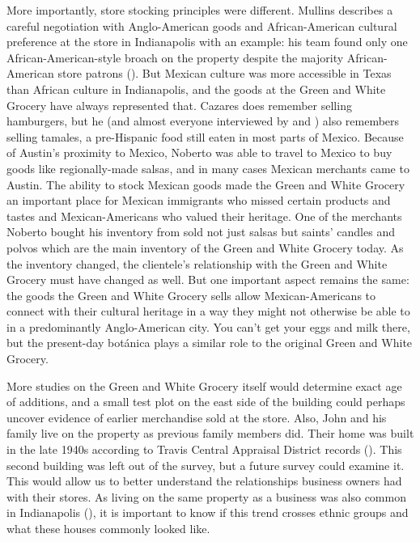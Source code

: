 More importantly, store stocking principles were different. Mullins describes a careful negotiation with Anglo-American goods and African-American cultural preference at the store in Indianapolis with an example: his team found only one African-American-style broach on the property despite the majority African-American store patrons (\cite[92]{mullins}). But Mexican culture was more accessible in Texas than African culture in Indianapolis, and the goods at the Green and White Grocery have always represented that. Cazares does remember selling hamburgers, but he
(and almost everyone interviewed by \textcite[75-76]{lepe} and \textcite{gandara})
also remembers selling tamales, a pre-Hispanic food still eaten in most parts of Mexico. Because of Austin's proximity to Mexico, Noberto was able to travel to Mexico to buy goods like regionally-made salsas, and in many cases Mexican merchants came to Austin. The ability to stock Mexican goods made the Green and White Grocery an important place for Mexican immigrants who missed certain products and tastes and Mexican-Americans who valued their heritage. One of the merchants Noberto bought his inventory from sold not just salsas but saints’ candles and polvos which are the main inventory of the Green and White Grocery today. As the inventory changed, the clientele's relationship with the Green and White Grocery must have changed as well. But one important aspect remains the same: the goods the Green and White Grocery sells allow Mexican-Americans to connect with their cultural heritage in a way they might not otherwise be able to in a predominantly Anglo-American city. You can't get your eggs and milk there, but the present-day botánica plays a similar role to the original Green and White Grocery.


More studies on the Green and White Grocery itself would determine exact age of additions, and a small test plot on the east side of the building could perhaps uncover evidence of earlier merchandise sold at the store. Also, John and his family live on the property as previous family members did. Their home was built in the late 1940s according to Travis Central Appraisal District records (\cite[75-76]{tcad}). This second building was left out of the survey, but a future survey could examine it. This would allow us to better understand the relationships business owners had with their stores. As living on the same property as a business was also common in Indianapolis (\cite{mullins}), it is important to know if this trend crosses ethnic groups and what these houses commonly looked like.

